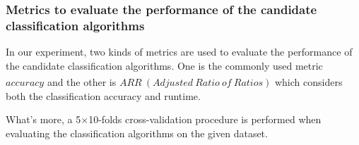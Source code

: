 \documentclass[review,3p,twocolumn,times]{elsarticle}
\newcommand{\upcite}[1]{\textsuperscript{\cite{#1}}}
\begin{document}
\subsubsection{Metrics to evaluate the performance of the candidate classification algorithms}

In our experiment, two kinds of metrics are used to evaluate the performance of the candidate classification algorithms. One is the commonly used metric $ accuracy $ and the other is $ ARR\ (Adjusted\ Ratio\ of\ Ratios) $\upcite{Brazdil2003Ranking} which considers both the classification accuracy and runtime. %



What's more, a 5$ \times $10-folds cross-validation procedure is performed when evaluating the classification algorithms on the given dataset.%
\end{document}

